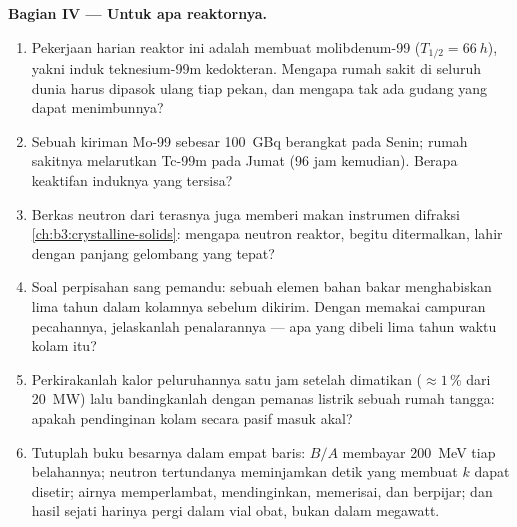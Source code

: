 \begin{problem}
\medskip\noindent\textbf{Bagian IV --- Untuk apa reaktornya.}

\begin{enumerate}[resume]
  \item Pekerjaan harian reaktor ini adalah membuat molibdenum-99
        ($T_{1/2} = \qty{66}{h}$), yakni induk teknesium-99m
        kedokteran. Mengapa rumah sakit di seluruh dunia harus
        dipasok ulang tiap pekan, dan mengapa tak ada gudang yang dapat menimbunnya?
  \item Sebuah kiriman Mo-99 sebesar \qty{100}{GBq} berangkat pada Senin;
        rumah sakitnya melarutkan Tc-99m pada Jumat (96 jam kemudian). Berapa
        keaktifan induknya yang tersisa?
  \item Berkas neutron dari terasnya juga memberi makan instrumen difraksi
        \cref{ch:b3:crystalline-solids}: mengapa neutron reaktor,
        begitu ditermalkan, lahir dengan panjang gelombang yang tepat?
  \item Soal perpisahan sang pemandu: sebuah elemen bahan bakar menghabiskan lima
        tahun dalam kolamnya sebelum dikirim. Dengan memakai campuran  pecahannya, jelaskanlah penalarannya --- apa yang dibeli lima
        tahun waktu kolam itu?
  \item Perkirakanlah kalor peluruhannya satu jam setelah dimatikan
        ($\approx1\,\%$ dari \qty{20}{MW}) lalu bandingkanlah dengan
        pemanas listrik sebuah rumah tangga: apakah pendinginan kolam
        secara pasif masuk akal?
  \item Tutuplah buku besarnya dalam empat baris: $B/A$ membayar
        \qty{200}{MeV} tiap belahannya; neutron tertundanya meminjamkan
        detik yang membuat $k$ dapat disetir; airnya memperlambat,
        mendinginkan, memerisai, dan berpijar; dan hasil sejati harinya
        pergi dalam vial obat, bukan dalam megawatt.
\end{enumerate}
\end{problem}
